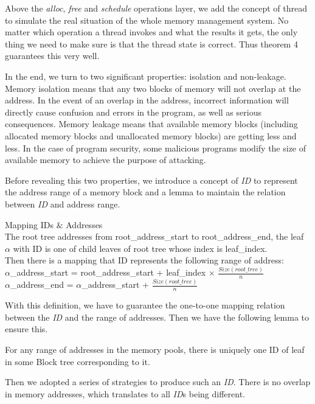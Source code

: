 \documentclass[runningheads]{llncs}
\begin{document}
Above the \textsl{alloc}, \textsl{free} and \textsl{schedule} operations layer, we add the concept of thread to simulate the real situation of the whole memory management system. No matter which operation a thread invokes and what the results it gets, the only thing we need to make sure is that the thread state is correct. Thus theorem 4 guarantees this very well.

In the end, we turn to two significant properties: isolation and non-leakage. Memory isolation means that any two blocks of memory will not overlap at the address. In the event of an overlap in the address, incorrect information will directly cause confusion and errors in the program, as well as serious consequences. Memory leakage means that available memory blocks (including allocated memory blocks and unallocated memory blocks) are getting less and less. In the case of program security, some malicious programs modify the size of available memory to achieve the purpose of attacking.

Before revealing this two properties, we introduce a concept of \textsl{ID} to represent the address range of a memory block and a lemma to maintain the relation between \textsl{ID} and address range.

\begin{definition} {Mapping IDs $\&$ Addresses} \\
The root tree addresses from root\_address\_start to root\_address\_end, the leaf $\alpha$ with ID is one of child leaves of root tree whose index is leaf\_index. \\
Then there is a mapping that ID represents the following range of address: \\
$\alpha$\_address\_start = root\_address\_start + leaf\_index $\times$ $\frac{Size (root\_tree)}{n}$ \\
$\alpha$\_address\_end = $\alpha$\_address\_start + $\frac{Size (root\_tree)}{n}$
\end{definition}

With this definition, we have to guarantee the one-to-one mapping relation between the \textsl{ID} and the range of addresses. Then we have the following lemma to ensure this.

\begin{lemma}
For any range of addresses in the memory pools, there is uniquely one ID of leaf in some Block tree corresponding to it.
\end{lemma}

Then we adopted a series of strategies to produce such an \textsl{ID}. There is no overlap in memory addresses, which translates to all \textsl{ID}s being different.
\end{document}
